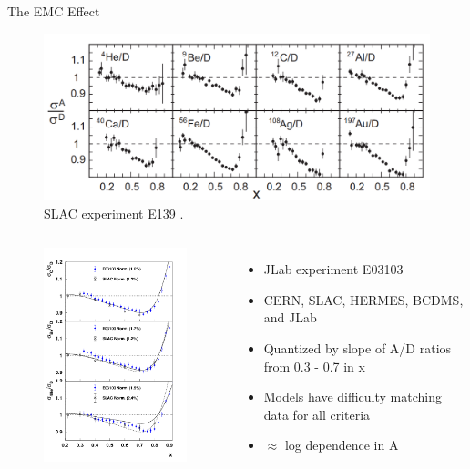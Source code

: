 \documentclass[12pt,usenames,dvipsnames]{beamer}
\begin{document}
\begin{frame}{The EMC Effect}

\begin{figure}
\caption*{\label{EMC_slac} SLAC experiment E139 \cite{slac_emc} .}
\includegraphics[width =12cm]{../images/EMC_slac_horiz.png}
\end{figure}


\end{frame}

\begin{frame}
\begin{columns}
\vspace{-20pt}
\begin{figure}
	\includegraphics[width=6cm]{../images/carbon_be_he4}
\end{figure}

{\hspace*{50pt}
	\begin{itemize}
		\item<1-> JLab experiment E03103 \cite{E3103} 
		\item<2-> CERN, SLAC, HERMES, BCDMS, and JLab
		\item<3-> Quantized by slope of A/D ratios from 0.3 - 0.7 in x
		\item<4-> Models have difficulty matching data for all criteria
		\item<5-> $\approx$ log dependence in A
	\end{itemize}
}
\end{columns}
\end{frame}
\end{document}
